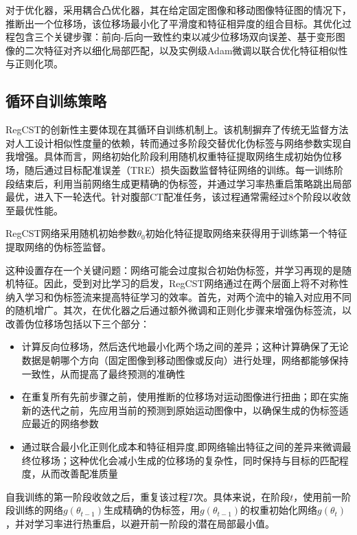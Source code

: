 对于优化器，采用耦合凸优化器\cite{siebert2022learn}，其在给定固定图像和移动图像特征图的情况下，推断出一个位移场，该位移场最小化了平滑度和特征相异度的组合目标。其优化过程包含三个关键步骤：前向-后向一致性约束以减少位移场双向误差、基于变形图像的二次特征对齐以细化局部匹配，以及实例级Adam微调以联合优化特征相似性与正则化项。

\subsection{循环自训练策略}

RegCST的创新性主要体现在其循环自训练机制上。该机制摒弃了传统无监督方法对人工设计相似性度量的依赖，转而通过多阶段交替优化伪标签与网络参数实现自我增强。具体而言，网络初始化阶段利用随机权重特征提取网络生成初始伪位移场，随后通过目标配准误差（TRE）损失函数监督特征网络的训练。每一训练阶段结束后，利用当前网络生成更精确的伪标签，并通过学习率热重启策略跳出局部最优，进入下一轮迭代。针对腹部CT配准任务，该过程通常需经过8个阶段以收敛至最优性能。

RegCST网络采用随机初始参数$\theta_0$初始化特征提取网络来获得用于训练第一个特征提取网络的伪标签监督。

这种设置存在一个关键问题：网络可能会过度拟合初始伪标签，并学习再现的是随机特征。因此，受到对比学习\cite{chen2021exploring}的启发，RegCST网络通过在两个层面上将不对称性纳入学习和伪标签流来提高特征学习的效率。首先，对两个流中的输入对应用不同的随机增广。其次，在优化器之后通过额外微调和正则化步骤来增强伪标签流，以改善伪位移场包括以下三个部分：

\begin{itemize}
    \item 计算反向位移场，然后迭代地最小化两个场之间的差异；这种计算确保了无论数据是朝哪个方向（固定图像到移动图像或反向）进行处理，网络都能够保持一致性，从而提高了最终预测的准确性
    \item 在重复所有先前步骤之前，使用推断的位移场对运动图像进行扭曲；即在实施新的迭代之前，先应用当前的预测到原始运动图像中，以确保生成的伪标签适应最近的网络参数
    \item 通过联合最小化正则化成本和特征相异度,即网络输出特征之间的差异来微调最终位移场；这种优化会减小生成的位移场的复杂性，同时保持与目标的匹配程度，从而改善配准质量
\end{itemize}

自我训练的第一阶段收敛之后，重复该过程$T$次。具体来说，在阶段$t$，使用前一阶段训练的网络$g(\theta_{t-1})$生成精确的伪标签，用$g(\theta_{t-1})$的权重初始化网络$g(\theta_{t})$，并对学习率进行热重启，以避开前一阶段的潜在局部最小值。


